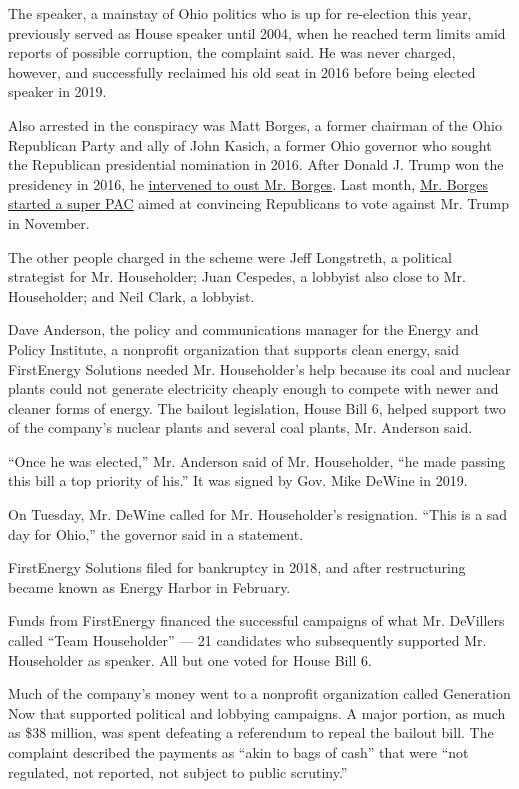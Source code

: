 The speaker, a mainstay of Ohio politics who is up for re-election this
year, previously served as House speaker until 2004, when he reached
term limits amid reports of possible corruption, the complaint said. He
was never charged, however, and successfully reclaimed his old seat in
2016 before being elected speaker in 2019.

Also arrested in the conspiracy was Matt Borges, a former chairman of
the Ohio Republican Party and ally of John Kasich, a former Ohio
governor who sought the Republican presidential nomination in 2016.
After Donald J. Trump won the presidency in 2016, he
\href{https://www.nytimes.com/2017/01/06/us/politics/donald-trump-transition.html}{intervened
to oust Mr. Borges}. Last month, \href{https://rightsidepac.com/}{Mr.
Borges started a super PAC} aimed at convincing Republicans to vote
against Mr. Trump in November.

The other people charged in the scheme were Jeff Longstreth, a political
strategist for Mr. Householder; Juan Cespedes, a lobbyist also close to
Mr. Householder; and Neil Clark, a lobbyist.

Dave Anderson, the policy and communications manager for the Energy and
Policy Institute, a nonprofit organization that supports clean energy,
said FirstEnergy Solutions needed Mr. Householder's help because its
coal and nuclear plants could not generate electricity cheaply enough to
compete with newer and cleaner forms of energy. The bailout legislation,
House Bill 6, helped support two of the company's nuclear plants and
several coal plants, Mr. Anderson said.

``Once he was elected,'' Mr. Anderson said of Mr. Householder, ``he made
passing this bill a top priority of his.'' It was signed by Gov. Mike
DeWine in 2019.

On Tuesday, Mr. DeWine called for Mr. Householder's resignation. ``This
is a sad day for Ohio,'' the governor said in a statement.

FirstEnergy Solutions filed for bankruptcy in 2018, and after
restructuring became known as Energy Harbor in February.

Funds from FirstEnergy financed the successful campaigns of what Mr.
DeVillers called ``Team Householder'' --- 21 candidates who subsequently
supported Mr. Householder as speaker. All but one voted for House Bill
6.

Much of the company's money went to a nonprofit organization called
Generation Now that supported political and lobbying campaigns. A major
portion, as much as \$38 million, was spent defeating a referendum to
repeal the bailout bill. The complaint described the payments as ``akin
to bags of cash'' that were ``not regulated, not reported, not subject
to public scrutiny.''

